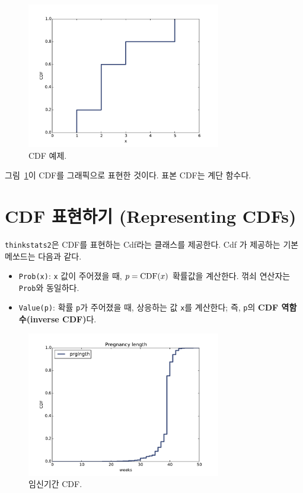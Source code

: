 \begin{figure}
\centerline{\includegraphics[height=2.5in]{figs/cumulative_example_cdf.pdf}}
\caption{CDF 예제.}
\label{example_cdf}
\end{figure}

그림~\ref{example_cdf}이 CDF를 그래픽으로 표현한 것이다.
표본 CDF는 계단 함수다.


\section{CDF 표현하기 (Representing CDFs)}

{\tt thinkstats2}은 CDF를 표현하는 Cdf라는 클래스를 제공한다. Cdf 가 제공하는 기본 메쏘드는 다음과 같다.

\begin{itemize}

\item {\tt Prob(x)}: {\tt x} 값이 주어졌을 때, $p = \mathrm{CDF}(x)$ 확률값을 계산한다. 꺾쇠 연산자는 {\tt Prob}와 동일하다.

\item {\tt Value(p)}: 확률 {\tt p}가 주어졌을 때, 
상응하는 값 {\tt x}를 계산한다; 즉, {\tt p}의 {\bf CDF 역함수(inverse CDF)}다.

\end{itemize}

\begin{figure}
\centerline{\includegraphics[height=2.5in]{figs/cumulative_prglngth_cdf.pdf}}
\caption{임신기간 CDF.}
\label{cumulative_prglngth_cdf}
\end{figure}


